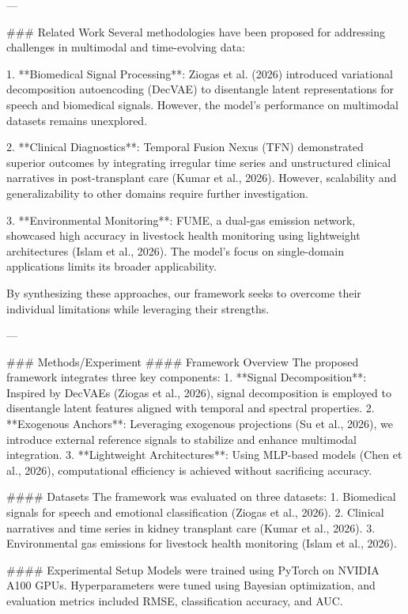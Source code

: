 ---

### Related Work  
Several methodologies have been proposed for addressing challenges in multimodal and time-evolving data:

1. **Biomedical Signal Processing**: Ziogas et al. (2026) introduced variational decomposition autoencoding (DecVAE) to disentangle latent representations for speech and biomedical signals. However, the model's performance on multimodal datasets remains unexplored.
   
2. **Clinical Diagnostics**: Temporal Fusion Nexus (TFN) demonstrated superior outcomes by integrating irregular time series and unstructured clinical narratives in post-transplant care (Kumar et al., 2026). However, scalability and generalizability to other domains require further investigation.

3. **Environmental Monitoring**: FUME, a dual-gas emission network, showcased high accuracy in livestock health monitoring using lightweight architectures (Islam et al., 2026). The model's focus on single-domain applications limits its broader applicability.

By synthesizing these approaches, our framework seeks to overcome their individual limitations while leveraging their strengths.

---

### Methods/Experiment  
#### Framework Overview  
The proposed framework integrates three key components:  
1. **Signal Decomposition**: Inspired by DecVAEs (Ziogas et al., 2026), signal decomposition is employed to disentangle latent features aligned with temporal and spectral properties.  
2. **Exogenous Anchors**: Leveraging exogenous projections (Su et al., 2026), we introduce external reference signals to stabilize and enhance multimodal integration.  
3. **Lightweight Architectures**: Using MLP-based models (Chen et al., 2026), computational efficiency is achieved without sacrificing accuracy.

#### Datasets  
The framework was evaluated on three datasets:  
1. Biomedical signals for speech and emotional classification (Ziogas et al., 2026).  
2. Clinical narratives and time series in kidney transplant care (Kumar et al., 2026).  
3. Environmental gas emissions for livestock health monitoring (Islam et al., 2026).

#### Experimental Setup  
Models were trained using PyTorch on NVIDIA A100 GPUs. Hyperparameters were tuned using Bayesian optimization, and evaluation metrics included RMSE, classification accuracy, and AUC.

